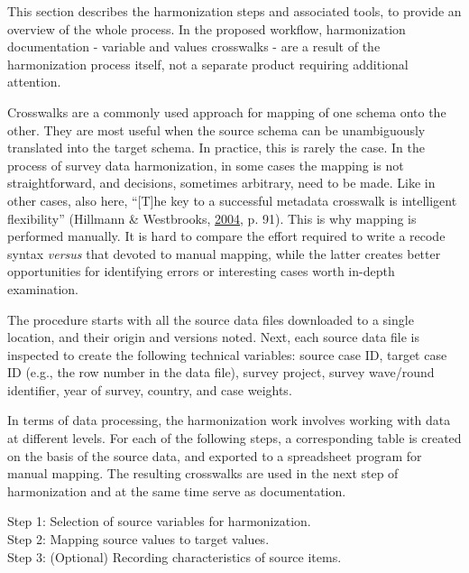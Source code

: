 \documentclass[12pt,]{article}
\begin{document}
This section describes the harmonization steps and associated tools, to provide an overview of the whole process. In the proposed workflow, harmonization documentation - variable and values crosswalks - are a result of the harmonization process itself, not a separate product requiring additional attention.

Crosswalks are a commonly used approach for mapping of one schema onto the other. They are most useful when the source schema can be unambiguously translated into the target schema. In practice, this is rarely the case. In the process of survey data harmonization, in some cases the mapping is not straightforward, and decisions, sometimes arbitrary, need to be made. Like in other cases, also here, ``{[}T{]}he key to a successful metadata crosswalk is intelligent flexibility'' (Hillmann \& Westbrooks, \protect\hyperlink{ref-Hillmann2004}{2004}, p. 91). This is why mapping is performed manually. It is hard to compare the effort required to write a recode syntax \emph{versus} that devoted to manual mapping, while the latter creates better opportunities for identifying errors or interesting cases worth in-depth examination.

The procedure starts with all the source data files downloaded to a single location, and their origin and versions noted. Next, each source data file is inspected to create the following technical variables: source case ID, target case ID (e.g., the row number in the data file), survey project, survey wave/round identifier, year of survey, country, and case weights.

In terms of data processing, the harmonization work involves working with data at different levels. For each of the following steps, a corresponding table is created on the basis of the source data, and exported to a spreadsheet program for manual mapping. The resulting crosswalks are used in the next step of harmonization and at the same time serve as documentation.

\parindent 0in

Step 1: Selection of source variables for harmonization.\\
Step 2: Mapping source values to target values.\\
Step 3: (Optional) Recording characteristics of source items.

\parindent 0.5in
\end{document}
